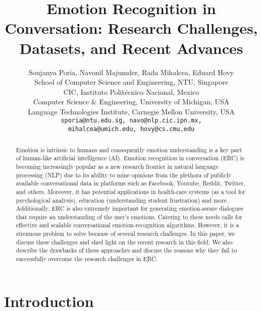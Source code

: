 \documentclass{IEEEtran}\usepackage[pdftex]{graphicx}
\begin{document}
\title{Emotion Recognition in Conversation: Research Challenges, Datasets, and Recent Advances}
	
	\author{Soujanya Poria, Navonil Majumder, Rada Mihalcea,
		Eduard Hovy \\
		\vspace{5mm}
		\small{  School of Computer Science and Engineering, NTU, Singapore} \\
		\small{ CIC, Instituto Polit\'ecnico Nacional, Mexico} \\
		\small{ Computer Science \& Engineering, University of Michigan, USA}\\
		\small{  Language Technologies Institute, Carnegie Mellon University, USA}\\ 
		\tt sporia@ntu.edu.sg, \tt navo@nlp.cic.ipn.mx, \\
		\tt mihalcea@umich.edu, \tt hovy@cs.cmu.edu  \\
	}
	\maketitle
	


	\begin{abstract}
Emotion is intrinsic to humans and consequently emotion understanding is a key part of human-like
		artificial intelligence (AI).
		Emotion recognition in conversation (ERC) is  becoming increasingly popular as a new research frontier in natural language
		processing (NLP) due to its ability to mine opinions from the plethora of publicly available conversational data in platforms
		such as Facebook, Youtube, Reddit, Twitter, and others. Moreover, it has potential applications in health-care systems (as a
		tool for psychological analysis), education (understanding student frustration) and more. Additionally, ERC is also extremely important for generating emotion-aware dialogues that require an understanding of the user's emotions. Catering
		to these needs calls for effective and scalable conversational emotion-recognition algorithms. However, it is a strenuous problem to solve because of several research challenges. In this paper, we discuss these challenges and shed light on the recent research in this  field. We also describe the drawbacks of these approaches and discuss the reasons why they fail to successfully overcome the research challenges in ERC.
\end{abstract}


	\section{Introduction}
	
\end{document}
